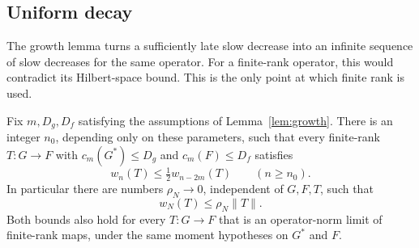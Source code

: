 \subsection{Uniform decay}

The growth lemma turns a sufficiently late slow decrease into an
infinite sequence of slow decreases for the same operator. For a
finite-rank operator, this would contradict its Hilbert-space bound.
This is the only point at which finite rank is used.

\begin{theorem}\label{thm:uniform-decay}
Fix \(m,D_g,D_f\) satisfying the assumptions of Lemma~\ref{lem:growth}.
There is an integer \(n_0\), depending only on these parameters,
such that every finite-rank \(T:G\to F\) with
\(c_m(G^*)\le D_g\) and \(c_m(F)\le D_f\) satisfies
\begin{equation}\label{eq:uniform-drop}
w_n(T)\le\tfrac12 w_{n-2m}(T)\qquad(n\ge n_0).
\end{equation}
In particular there are numbers \(\rho_N\to0\), independent of
\(G,F,T\), such that
\begin{equation}\label{eq:uniform-decay}
w_N(T)\le\rho_N\|T\|.
\end{equation}
Both bounds also hold for every \(T:G\to F\) that is an
operator-norm limit of finite-rank maps, under the same moment
hypotheses on \(G^*\) and \(F\).
\end{theorem}
